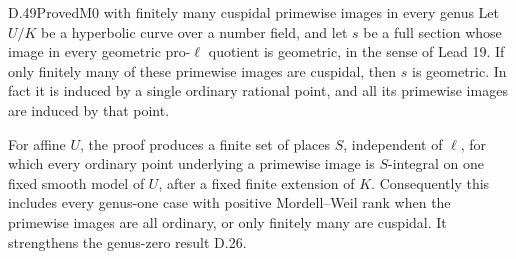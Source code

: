 \begin{statement}{D.49}{Proved}{M0 with finitely many cuspidal primewise images in every genus}
Let \(U/K\) be a hyperbolic curve
over a number field, and let \(s\) be a full
section whose image in every geometric pro-\(\ell\)
quotient is geometric, in the sense of Lead 19.
If only finitely many of these primewise images
are cuspidal, then \(s\) is geometric.
In fact it is induced by a single ordinary
rational point, and all its primewise images
are induced by that point.

For affine \(U\), the proof produces a finite
set of places \(S\), independent of \(\ell\),
for which every ordinary point underlying a
primewise image is \(S\)-integral on one
fixed smooth model of \(U\), after a fixed
finite extension of \(K\).
Consequently this includes every genus-one
case with positive Mordell--Weil rank when
the primewise images are all ordinary, or
only finitely many are cuspidal.
It strengthens the genus-zero result D.26.
\end{statement}
